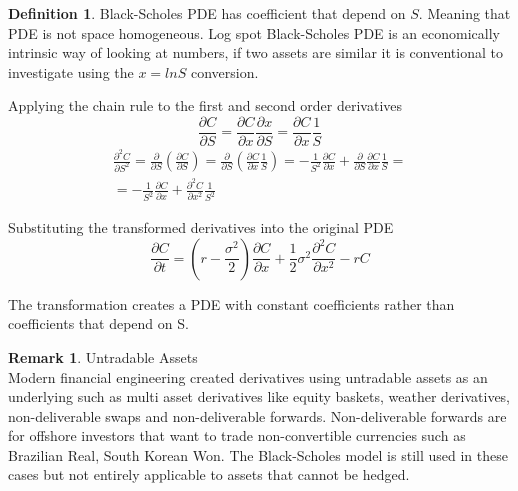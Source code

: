 \documentclass[12pt, oneside]{book}
\theoremstyle{plain}
\theoremstyle{definition}
\newtheorem{definition}[theorem]{Definition}
\newtheorem{remark}[theorem]{Remark}
\begin{document}
\begin{definition} 
Black-Scholes PDE has coefficient that depend on $S$. Meaning that PDE is not space homogeneous. Log spot Black-Scholes PDE is an economically intrinsic way of looking at numbers, if two assets are similar it is conventional to investigate using the $x = ln S$ conversion. 

Applying the chain rule to the first and second order derivatives
\begin{equation}
\frac{\partial C}{\partial S} = \frac{\partial C}{\partial x} \frac{\partial x}{\partial S} = \frac{\partial C}{\partial x} \frac{1}{S}
\end{equation}
\begin{eqnarray}
\frac{\partial^2 C}{\partial S^2} = \frac{\partial }{\partial S} (\frac{\partial C}{\partial S}) = \frac{\partial }{\partial S} (\frac{\partial C}{\partial x} \frac{1}{S}) = -\frac{1}{S^2} \frac{\partial C}{\partial x} + \frac{\partial }{\partial S} \frac{\partial C}{\partial x} \frac{1}{S} = \\
 = -\frac{1}{S^2} \frac{\partial C}{\partial x} + \frac{\partial^2 C}{\partial x^2} \frac{1}{S^2} 
\end{eqnarray}

Substituting the transformed derivatives into the original PDE 
\begin{equation}
\frac{\partial C}{\partial t} = (r - \frac{\sigma^2}{2})\frac{\partial C}{\partial x}+\frac{1}{2} \sigma^2 \frac{\partial^2 C}{\partial x^2} - rC
\end{equation}

The transformation creates a PDE with constant coefficients rather than coefficients that depend on S. 

\end{definition}
\begin{remark}Untradable Assets\\ Modern financial engineering created derivatives using untradable assets as an underlying such as multi asset derivatives like equity baskets, weather derivatives, non-deliverable swaps and non-deliverable forwards. Non-deliverable forwards are for offshore investors that want to trade non-convertible currencies such as Brazilian Real, South Korean Won.  The Black-Scholes model is still used in these cases \cite{weather} \cite{basket} but not entirely applicable to assets that cannot be hedged.
\end{remark}
\end{document}
